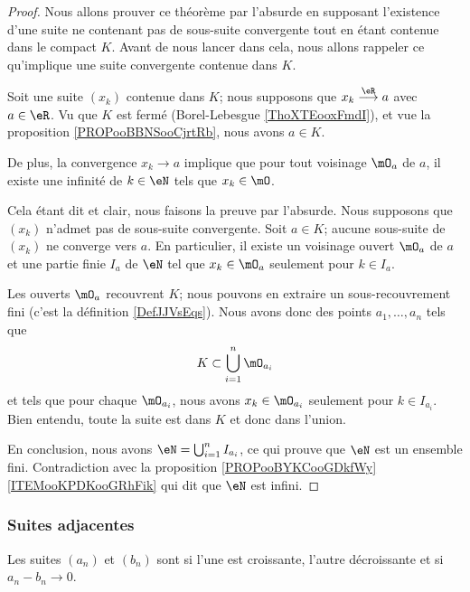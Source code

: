 \begin{proof}
    Nous allons prouver ce théorème par l'absurde en supposant l'existence d'une suite ne contenant pas de sous-suite convergente tout en étant contenue dans le compact \( K\). Avant de nous lancer dans cela, nous allons rappeler ce qu'implique une suite convergente contenue dans \( K\).

    Soit une suite \( (x_k)\) contenue dans \( K\); nous supposons que \( x_k\stackrel{\eR}{\longrightarrow} a\) avec \( a\in \eR\). Vu que \( K\) est fermé (Borel-Lebesgue \ref{ThoXTEooxFmdI}), et vue la proposition \ref{PROPooBBNSooCjrtRb}, nous avons \( a\in K\).

    De plus, la convergence \( x_k\to a\) implique que pour tout voisinage \( \mO_a\) de \( a\), il existe une infinité de \( k\in \eN\) tels que \( x_k\in\mO\).

    Cela étant dit et clair, nous faisons la preuve par l'absurde. Nous supposons que \( (x_k)\) n'admet pas de sous-suite convergente. Soit \( a\in K\); aucune sous-suite de \( (x_k)\) ne converge vers \( a\). En particulier, il existe un voisinage ouvert \( \mO_a\) de \( a\) et une partie finie \( I_a\) de \( \eN\) tel que \( x_k\in \mO_a\) seulement pour \( k\in I_a\).

    Les ouverts \( \mO_a\) recouvrent \( K\); nous pouvons en extraire un sous-recouvrement fini (c'est la définition \ref{DefJJVsEqs}). Nous avons donc des points \( a_1,\ldots, a_n\) tels que 
    \begin{equation}
        K\subset \bigcup_{i=1}^n\mO_{a_i}
    \end{equation}
    et tels que pour chaque \( \mO_{a_i}\), nous avons \( x_k\in \mO_{a_i}\) seulement pour \( k\in I_{a_i}\). Bien entendu, toute la suite est dans \( K\) et donc dans l'union.

    En conclusion, nous avons \( \eN=\bigcup_{i=1}^n I_{a_i}\), ce qui prouve que \( \eN\) est un ensemble fini. Contradiction avec la proposition \ref{PROPooBYKCooGDkfWy}\ref{ITEMooKPDKooGRhFik} qui dit que \( \eN\) est infini.
\end{proof}


\subsubsection{Suites adjacentes}

\begin{definition}       \label{DEFooDMZLooDtNPmu}
    Les suites \( (a_n)\) et \( (b_n)\) sont  si l'une est croissante, l'autre décroissante et si \( a_n-b_n\to 0\).
\end{definition}

